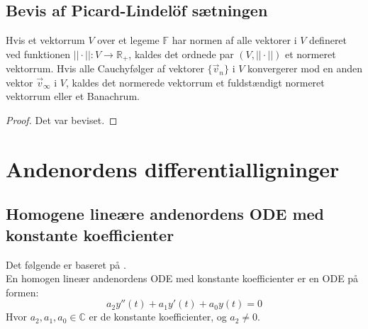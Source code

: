 \subsection{Bevis af Picard-Lindelöf sætningen}

\begin{definition}
Hvis et vektorrum $V$ over et legeme $\mathbb{F}$ har normen af alle vektorer i $V$ defineret ved funktionen $||\cdot||:V\to \mathbb{R}_+$, kaldes det ordnede par $(V,||\cdot||)$ et normeret vektorrum.
Hvis alle Cauchyfølger af vektorer $\{\vec{v}_n\}$ i $V$ konvergerer mod en anden vektor $\vec{v}_\infty$ i $V$, kaldes det normerede vektorrum et fuldstændigt normeret vektorrum eller et Banachrum.
\end{definition}

\begin{proof}
Det var beviset.
\end{proof}

\section{Andenordens differentialligninger}
\subsection{Homogene lineære andenordens ODE med konstante koefficienter}
Det følgende er baseret på \citep[s. 221]{JAB}. \\ \hfill \break En homogen lineær andenordens ODE med konstante koefficienter er en ODE på formen: \hfill \break
\begin{equation}
\label{homlinandord}
    a_2y''(t)+a_1y'(t)+a_0y(t)=0
\end{equation} \hfill \break
Hvor $a_2,a_1,a_0\in \mathbb{C}$ er de konstante koefficienter, og $a_2\neq 0$. \hfill \break


